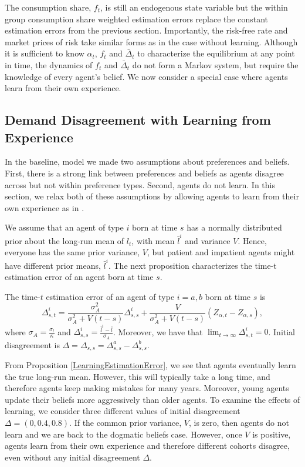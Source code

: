 The consumption share, $f_t$, is still an endogenous state variable but the within group consumption share weighted estimation errors replace the constant estimation errors from the previous section. Importantly, the risk-free rate and market prices of risk take similar forms as in the case without learning. Although it is sufficient to know $\alpha_t$, $f_t$ and $\bar{\Delta}_t$ to characterize the equilibrium at any point in time, the dynamics of $f_t$ and $\bar{\Delta}_t$ do not form a Markov system, but require the knowledge of every agent's belief. We now consider a special case where agents learn from their own experience. 

\subsection{Demand Disagreement with Learning from Experience}

In the baseline, model we made two assumptions about preferences and beliefs. First, there is a strong link between preferences and beliefs as agents disagree across but not within preference types. Second, agents do not learn. In this section, we relax both of these assumptions by allowing agents to learn from their own experience as in \cite{EGH18}. 

We assume that an agent of type $i$ born at time $s$ has a normally distributed prior about the long-run mean of $l_t$, with mean $\bar{l}^i$ and variance $V$. Hence, everyone has the same prior variance, $V$, but patient and impatient agents might have different prior means, $\bar{l}^i$. The next proposition characterizes the time-t estimation error of an agent born at time $s$.
\begin{prop}\label{LearningEstimationError}
The time-$t$ estimation error of an agent of type $i=a,b$ born at time $s$ is 
\begin{equation}
	 \Delta^i_{s,t} = \frac{\sigma_{A}^2}{\sigma_{A}^2 + V\left(t-s\right)}\Delta^i_{s,s} + \frac{V}{\sigma_{A}^2 + V\left(t-s\right)}\left(Z_{\alpha,t}-Z_{\alpha,s}\right),
\end{equation}
where $\sigma_{A} = \frac{\sigma_l}{\kappa}$ and $\Delta^i_{s,s} = \frac{\bar{l}^i-\bar{l}}{\sigma_{A}}$. Moreover, we have that $\lim_{t\to\infty} \Delta^i_{s,t} =0$. Initial disagreement is  $\Delta = \Delta_{s,s}  = \Delta^a_{s,s}-\Delta^b_{s,s}$.
\end{prop} 
From Proposition \ref{LearningEstimationError}, we see that agents eventually learn the true long-run mean. However, this will typically take a long time, and therefore agents keep making mistakes for many years. Moreover, young agents update their beliefs more aggressively than older agents. To examine the effects of learning, we consider three different values of initial disagreement $\Delta = \left(0,0.4,0.8\right)$. If the common prior variance, $V$, is zero, then agents do not learn and we are back to the dogmatic beliefs case. However, once $V$ is positive, agents learn from their own experience and therefore different cohorts disagree, even without any initial disagreement $\Delta$.  

